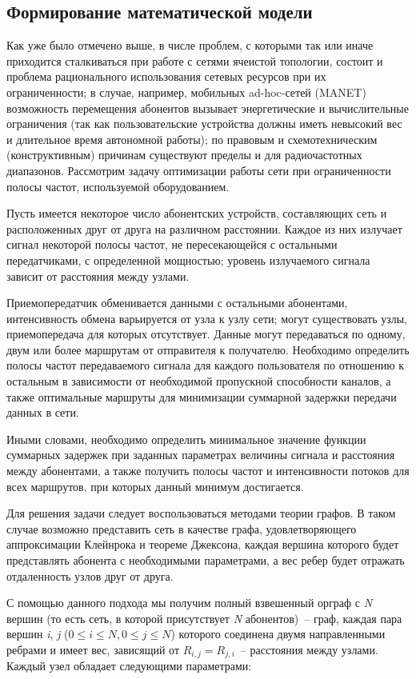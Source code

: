 \documentclass[14pt,a4paper,titlepage]{extarticle}
\begin{document}
\subsection{Формирование математической модели}
Как уже было отмечено выше, в числе проблем, с которыми так или иначе приходится сталкиваться при работе с сетями ячеистой топологии, состоит и проблема рационального использования сетевых ресурсов при их ограниченности; в случае, например, мобильных ad-hoc-сетей (MANET) возможность перемещения абонентов вызывает энергетические и вычислительные ограничения (так как пользовательские устройства должны иметь невысокий вес и длительное время автономной работы); по правовым и схемотехническим (конструктивным) причинам существуют пределы и для радиочастотных диапазонов. Рассмотрим задачу оптимизации работы сети при ограниченности полосы частот, используемой оборудованием. 

Пусть имеется некоторое число абонентских устройств, составляющих сеть и расположенных друг от друга на различном расстоянии. Каждое из них излучает сигнал некоторой полосы частот, не пересекающейся с остальными передатчиками, с определенной мощностью; уровень излучаемого сигнала зависит от расстояния между узлами. 

Приемопередатчик обменивается данными с остальными абонентами, интенсивность обмена варьируется от узла к узлу сети; могут существовать узлы, приемопередача для которых отсутствует. Данные могут передаваться по одному, двум или более маршрутам от отправителя к получателю. Необходимо определить полосы частот передаваемого сигнала для каждого пользователя по отношению к остальным в зависимости от необходимой пропускной способности каналов, а также оптимальные маршруты для минимизации суммарной задержки передачи данных в сети. 

Иными словами, необходимо определить минимальное значение функции суммарных задержек при заданных параметрах величины сигнала и расстояния между абонентами, а также получить полосы частот и интенсивности потоков для всех маршрутов, при которых данный минимум достигается. 

Для решения задачи следует воспользоваться методами теории графов. В таком случае возможно представить сеть в качестве графа, удовлетворяющего аппроксимации Клейнрока и теореме Джексона, каждая вершина которого будет представлять абонента с необходимыми параметрами, а вес ребер будет отражать отдаленность узлов друг от друга. 

С помощью данного подхода мы получим полный взвешенный орграф с \textit{N} вершин (то есть сеть, в которой присутствует \textit{N} абонентов)~-- граф, каждая пара вершин \textit{i}, \textit{j} ($0 \leq i \leq N, 0 \leq j \leq N$) которого соединена двумя направленными ребрами и имеет вес, зависящий от $R_{i, j}=R_{j, i}$~-- расстояния между узлами. Каждый узел обладает следующими параметрами:
\end{document}
